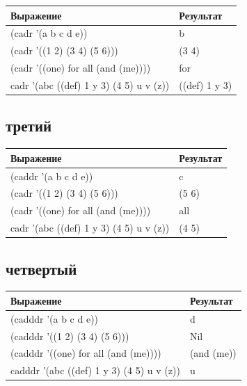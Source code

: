 \documentclass[a4paper,12pt]{article}
\begin{document}
	\begin{table} [h!]
		\begin{center}
			\begin{tabular}{|l|l|}
				\hline
				{\bf  Выражение} &    {\bf Результат} \\
				\hline
				{ (cadr '(a b c d e))}& b\\
				\hline
				{(cadr '((1 2) (3 4) (5 6)))}& (3 4)\\
				\hline
				{ (cadr '((one) for all (and (me))))}& for\\
				\hline
				{ cadr '(abc ((def) 1 y 3) (4 5) u v (z))}& ((def) 1 y 3)\\
				\hline
			\end{tabular}  
			\label{m1}
		\end{center}
	\end{table}
	
	\subsection{третий}
	
	\begin{table} [h!]
		\begin{center}
			\begin{tabular}{|l|l|}
				\hline
				{Выражение} &    {\bf Результат} \\
				\hline
				{(caddr '(a b c d e))}& c\\
				\hline
				{ (cadr '((1 2) (3 4) (5 6)))}& (5 6)\\
				\hline
				{ (cadr '((one) for all (and (me))))}& all\\
				\hline
				{ cadr '(abc ((def) 1 y 3) (4 5) u v (z))}& (4 5)\\
				\hline
			\end{tabular}  
			\label{m2}
		\end{center}
	\end{table}
	
	\subsection{четвертый}
	
	\begin{table} [h!]
		\begin{center}
			\begin{tabular}{|l|l|}
				\hline
				{Выражение} &    {\bf Результат} \\
				\hline
				{(cadddr '(a b c d e))}& d\\
				\hline
				{ (cadddr '((1 2) (3 4) (5 6)))}& Nil\\
				\hline
				{(cadddr '((one) for all (and (me))))}& (and (me))\\
				\hline
				{cadddr '(abc ((def) 1 y 3) (4 5) u v (z))}& u\\
				\hline
			\end{tabular}  
			\label{m3}
		\end{center}
	\end{table}
	
\end{document}
